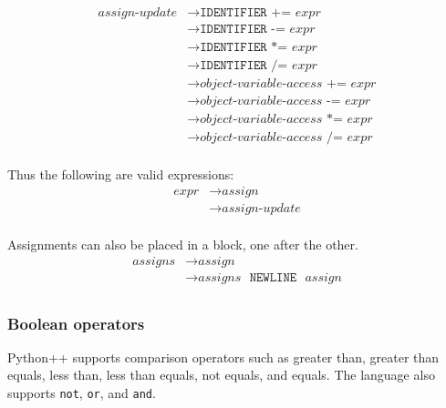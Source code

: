 \documentclass{article}
\begin{document}
\label{sec:assign-update}
\begin{align*}
    \textit{assign-update} &\to \texttt{IDENTIFIER} \texttt{ += } \hyperref[sec:expr]{\textit{expr}} \\
    &\to \texttt{IDENTIFIER} \texttt{ -= } \hyperref[sec:expr]{\textit{expr}} \\
    &\to \texttt{IDENTIFIER} \texttt{ *= } \hyperref[sec:expr]{\textit{expr}} \\
    &\to \texttt{IDENTIFIER} \texttt{ /= } \hyperref[sec:expr]{\textit{expr}} \\
    &\to \hyperref[sec:object-variable-access]{\textit{object-variable-access}} \texttt{ += } \hyperref[sec:expr]{\textit{expr}} \\
    &\to \hyperref[sec:object-variable-access]{\textit{object-variable-access}} \texttt{ -= } \hyperref[sec:expr]{\textit{expr}} \\
    &\to \hyperref[sec:object-variable-access]{\textit{object-variable-access}} \texttt{ *= } \hyperref[sec:expr]{\textit{expr}} \\
    &\to \hyperref[sec:object-variable-access]{\textit{object-variable-access}} \texttt{ /= } \hyperref[sec:expr]{\textit{expr}} \\
\end{align*}

Thus the following are valid expressions:
\begin{align*}
    \textit{expr} &\to \hyperref[sec:assign]{\textit{assign}} \\
    &\to \hyperref[sec:assign-update]{\textit{assign-update}} \\
\end{align*}

Assignments can also be placed in a block, one after the other.
\label{sec:assigns}
\begin{align*}
    \textit{assigns} &\to \hyperref[sec:assign]{\textit{assign}} \\
    &\to \hyperref[sec:assigns]{\textit{assigns}} \texttt{ } \texttt{NEWLINE} \texttt{ } \hyperref[sec:assign]{\textit{assign}} \\
\end{align*}

\subsubsection{Boolean operators}
\label{sec:expr-boolean-operators}
Python++ supports comparison operators such as greater than, greater than equals, less than, less than equals, not equals, and equals. The language also supports \texttt{not}, \texttt{or}, and \texttt{and}.
\end{document}
